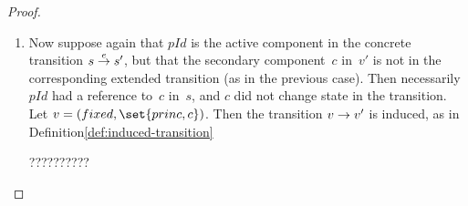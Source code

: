 \begin{proof}
\begin{enumerate}
\item Now suppose again that $pId$ is the active component in the concrete
  transition $s \stackrel{e}\rightarrow s'$, but that the secondary component~$c$ in~$v'$ is
  not in the corresponding extended transition (as in the previous case).
  Then necessarily $pId$ had a reference to~$c$ in~$s$, and $c$ did not change
  state in the transition.  Let $v = (fixed, \set{princ, c})$.  Then the
  transition $v \stackrel{}\rightarrow v'$ is induced, as in Definition\ref{def:induced-transition}

??????????

\end{enumerate}

\end{proof}
